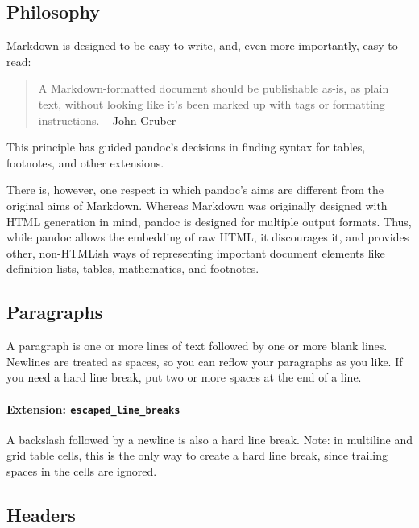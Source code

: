 \documentclass[]{article}
\let\oldparagraph\paragraph
\renewcommand{\paragraph}[1]{\oldparagraph{#1}\mbox{}}
\begin{document}
\subsection{Philosophy}\label{philosophy}

Markdown is designed to be easy to write, and, even more importantly,
easy to read:

\begin{quote}
A Markdown-formatted document should be publishable as-is, as plain
text, without looking like it's been marked up with tags or formatting
instructions. --
\href{http://daringfireball.net/projects/markdown/syntax\#philosophy}{John
Gruber}
\end{quote}

This principle has guided pandoc's decisions in finding syntax for
tables, footnotes, and other extensions.

There is, however, one respect in which pandoc's aims are different from
the original aims of Markdown. Whereas Markdown was originally designed
with HTML generation in mind, pandoc is designed for multiple output
formats. Thus, while pandoc allows the embedding of raw HTML, it
discourages it, and provides other, non-HTMLish ways of representing
important document elements like definition lists, tables, mathematics,
and footnotes.

\subsection{Paragraphs}\label{paragraphs}

A paragraph is one or more lines of text followed by one or more blank
lines. Newlines are treated as spaces, so you can reflow your paragraphs
as you like. If you need a hard line break, put two or more spaces at
the end of a line.

\paragraph{\texorpdfstring{Extension:
\texttt{escaped\_line\_breaks}}{Extension: escaped\_line\_breaks}}\label{extension-escaped_line_breaks}

A backslash followed by a newline is also a hard line break. Note: in
multiline and grid table cells, this is the only way to create a hard
line break, since trailing spaces in the cells are ignored.

\subsection{Headers}\label{headers}
\end{document}

